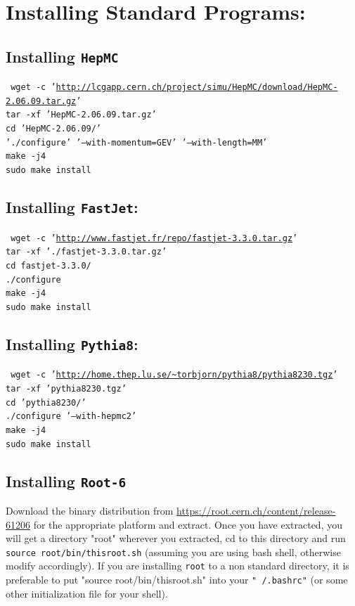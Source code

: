 \section{Installing Standard Programs:}

\subsection{Installing {\tt HepMC}}
{\tt
wget -c '\url{http://lcgapp.cern.ch/project/simu/HepMC/download/HepMC-2.06.09.tar.gz}'\\
tar -xf 'HepMC-2.06.09.tar.gz'\\
cd 'HepMC-2.06.09/'\\
'./configure' '--with-momentum=GEV' '--with-length=MM'\\
make -j4\\
sudo make install\\
}

\subsection{Installing {\tt FastJet}:}
{\tt
wget -c '\url{http://www.fastjet.fr/repo/fastjet-3.3.0.tar.gz}'\\
tar -xf './fastjet-3.3.0.tar.gz'\\
cd fastjet-3.3.0/\\
./configure\\
make -j4\\
sudo make install\\
}

\subsection{Installing {\tt Pythia8}:}
{\tt
wget -c '\url{http://home.thep.lu.se/~torbjorn/pythia8/pythia8230.tgz}'\\
tar -xf 'pythia8230.tgz'\\
cd 'pythia8230/'\\
./configure '--with-hepmc2'\\
make -j4\\
sudo make install\\
}

\subsection{Installing {\tt Root-6}}
Download the binary distribution from \url{https://root.cern.ch/content/release-61206} for the appropriate platform and extract.
Once you have extracted, you will get a directory "root" wherever you extracted, cd to this directory and run
{\tt source root/bin/thisroot.sh} (assuming you are using bash shell, otherwise modify accordingly). If you are installing {\tt root} to a non standard directory, it is preferable to put "source root/bin/thisroot.sh" into your {\tt "~/.bashrc"} (or some other initialization file for your shell).

